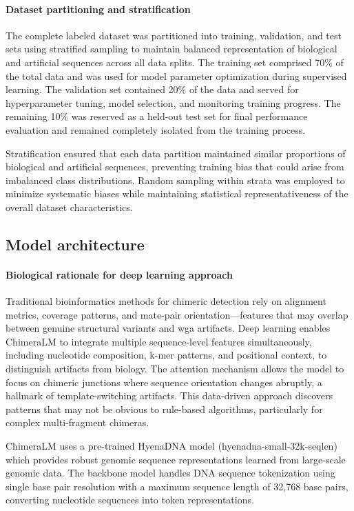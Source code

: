 \documentclass[pdflatex,sn-nature]{sn-jnl}%
\theoremstyle{thmstyleone}%
\theoremstyle{thmstyletwo}%
\theoremstyle{thmstylethree}%
\begin{document}
\paragraph{Dataset partitioning and stratification}
The complete labeled dataset was partitioned into training, validation, and test sets using stratified sampling to maintain balanced representation of biological and artificial sequences across all data splits.
The training set comprised 70\% of the total data and was used for model parameter optimization during supervised learning.
The validation set contained 20\% of the data and served for hyperparameter tuning, model selection, and monitoring training progress.
The remaining 10\% was reserved as a held-out test set for final performance evaluation and remained completely isolated from the training process.

Stratification ensured that each data partition maintained similar proportions of biological and artificial sequences, preventing training bias that could arise from imbalanced class distributions. Random sampling within strata was employed to minimize systematic biases while maintaining statistical representativeness of the overall dataset characteristics.

\subsection*{Model architecture}

\paragraph{Biological rationale for deep learning approach}

Traditional bioinformatics methods for chimeric detection rely on alignment metrics, coverage patterns, and mate-pair orientation---features that may overlap between genuine structural variants and \gls{wga} artifacts.
Deep learning enables ChimeraLM to integrate multiple sequence-level features simultaneously, including nucleotide composition, k-mer patterns, and positional context, to distinguish artifacts from biology.
The attention mechanism allows the model to focus on chimeric junctions where sequence orientation changes abruptly, a hallmark of template-switching artifacts.
This data-driven approach discovers patterns that may not be obvious to rule-based algorithms, particularly for complex multi-fragment chimeras.

ChimeraLM uses a pre-trained HyenaDNA model (hyenadna-small-32k-seqlen) which provides robust genomic sequence representations learned from large-scale genomic data.
The backbone model handles DNA sequence tokenization using single base pair resolution with a maximum sequence length of 32,768 base pairs, converting nucleotide sequences into token representations.
\end{document}
